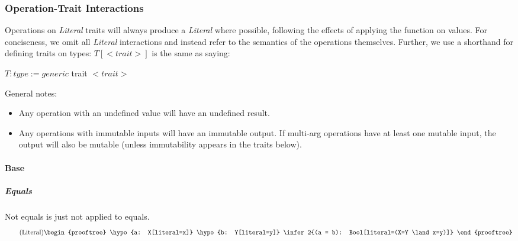 \subsubsection{Operation-Trait Interactions}
Operations on \textit{Literal} traits will always produce a \textit{Literal} where possible, following the effects of applying the function on values. For conciseness, we omit all \textit{Literal} interactions and instead refer to the semantics of the operations themselves. Further, we use a shorthand for defining traits on types: $T[<trait>]$ is the same as saying:
\begin{algorithmic}
    \State $T: type := generic$
    \State \quad trait $<trait>$
\end{algorithmic}

General notes:
\begin{itemize}
  \item Any operation with an undefined value will have an undefined result.
  \item Any operations with immutable inputs will have an immutable output. If multi-arg operations have at least one mutable input, the output will also be mutable (unless immutability appears in the traits below).
\end{itemize}

\paragraph{Base}
\subparagraph{Equals} Not equals is just not applied to equals.
\begin{gather}
  \tag{Literal}
  \begin{prooftree}
    \hypo{a: X[literal=x]}
    \hypo{b: Y[literal=y]}
    \infer2{(a = b): Bool[literal=(X=Y \land x=y)]}
  \end{prooftree}
\end{gather}
